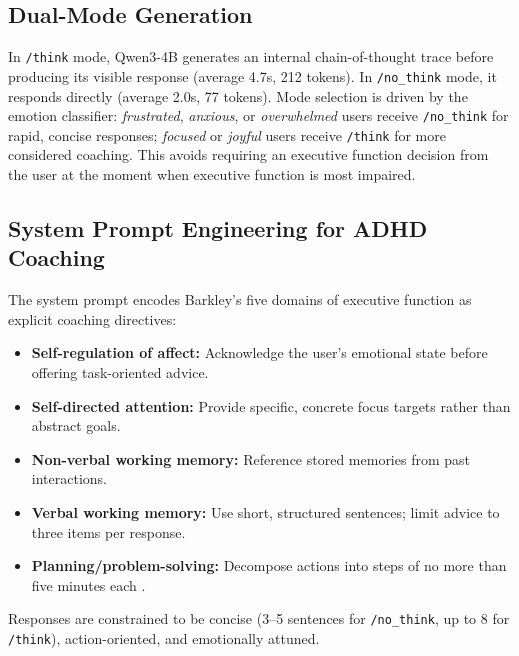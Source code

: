 \subsection{Dual-Mode Generation}
\label{subsec:dual-mode}

In \texttt{/think} mode, Qwen3-4B generates an internal chain-of-thought trace before producing its visible response (average 4.7s, 212 tokens). In \texttt{/no\_think} mode, it responds directly (average 2.0s, 77 tokens). Mode selection is driven by the emotion classifier: \emph{frustrated}, \emph{anxious}, or \emph{overwhelmed} users receive \texttt{/no\_think} for rapid, concise responses; \emph{focused} or \emph{joyful} users receive \texttt{/think} for more considered coaching. This avoids requiring an executive function decision from the user at the moment when executive function is most impaired.

\subsection{System Prompt Engineering for ADHD Coaching}
\label{subsec:system-prompt}

The system prompt encodes Barkley's five domains of executive function \cite{barkley2010} as explicit coaching directives:

\begin{itemize}[nosep]
  \item \textbf{Self-regulation of affect:} Acknowledge the user's emotional state before offering task-oriented advice.
  \item \textbf{Self-directed attention:} Provide specific, concrete focus targets rather than abstract goals.
  \item \textbf{Non-verbal working memory:} Reference stored memories from past interactions.
  \item \textbf{Verbal working memory:} Use short, structured sentences; limit advice to three items per response.
  \item \textbf{Planning/problem-solving:} Decompose actions into steps of no more than five minutes each \cite{diamond2013}.
\end{itemize}

\noindent Responses are constrained to be concise (3--5 sentences for \texttt{/no\_think}, up to 8 for \texttt{/think}), action-oriented, and emotionally attuned.

